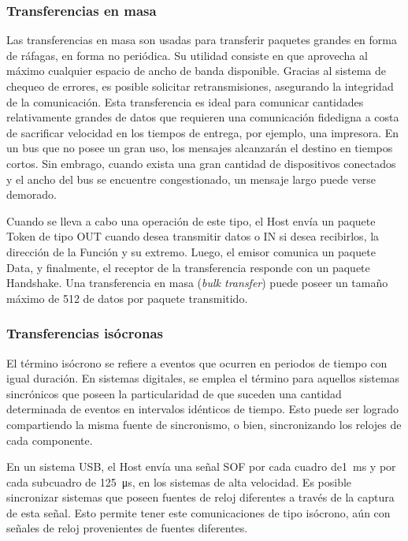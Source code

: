 \subsubsection{Transferencias en masa}
	Las transferencias en masa son usadas para transferir paquetes grandes en forma de ráfagas, en forma no periódica. Su utilidad consiste en que aprovecha al máximo cualquier espacio de ancho de banda disponible. Gracias al sistema de chequeo de errores, es posible solicitar retransmisiones, asegurando la integridad de la comunicación. Esta transferencia es ideal para comunicar cantidades relativamente grandes de datos que requieren una comunicación fidedigna a costa de sacrificar velocidad en los tiempos de entrega, por ejemplo, una impresora. En un bus que no posee un gran uso, los mensajes alcanzarán el destino en tiempos cortos. Sin embrago, cuando exista una gran cantidad de dispositivos conectados y el ancho del bus se encuentre congestionado, un mensaje largo puede verse demorado.%

	Cuando se lleva a cabo una operación de este tipo, el Host envía un paquete Token de tipo OUT cuando desea transmitir datos o IN si desea recibirlos, la dirección de la Función y su extremo. Luego, el emisor comunica un paquete Data, y finalmente, el receptor de la transferencia responde con un paquete Handshake. Una transferencia en masa ({\it bulk transfer}) puede poseer un tamaño máximo de \SI{512}{\byte} de datos por paquete transmitido.
	
\subsubsection{Transferencias isócronas}
	El término isócrono se refiere a eventos que ocurren en periodos de tiempo con igual duración. En sistemas digitales, se emplea el término para aquellos sistemas sincrónicos que poseen la particularidad de que suceden una cantidad determinada de eventos en intervalos idénticos de tiempo. Esto puede ser logrado compartiendo la misma fuente de sincronismo, o bien, sincronizando los relojes de cada componente. 
	
	En un sistema USB, el Host envía una señal SOF por cada cuadro de\SI{1}{\milli\second} y por cada subcuadro de  \SI{125}{\micro\second}, en los sistemas de alta velocidad. Es posible sincronizar sistemas que poseen fuentes de reloj diferentes a través de la captura de esta señal. Esto permite tener este comunicaciones de tipo isócrono, aún con señales de reloj provenientes de fuentes diferentes.%
	
